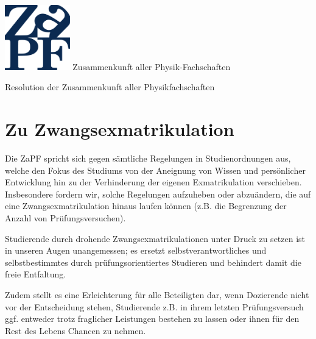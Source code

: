 \documentclass[DIV=calc]{scrartcl}
\begin{document}
    \hspace{0.87\textwidth}
    \begin{minipage}{120pt}
        \vspace{-1.8cm}
        \includegraphics[width=80pt]{../../logo.pdf}
        \centering
        \small Zusammenkunft aller Physik-Fachschaften
    \end{minipage}
    \begin{center}
        \huge{Resolution der Zusammenkunft aller Physikfachschaften}\vspace{.25\baselineskip}\\
        \normalsize
    \end{center}
    \vspace{1cm} 
    
\section*{Zu Zwangsexmatrikulation} 
       
Die ZaPF spricht sich gegen sämtliche Regelungen in Studienordnungen aus, welche den Fokus des Studiums von der Aneignung von Wissen und persönlicher Entwicklung hin zu der Verhinderung der eigenen Exmatrikulation verschieben. Insbesondere fordern wir, solche Regelungen aufzuheben oder abzuändern,  die auf eine Zwangsexmatrikulation hinaus laufen können (z.B. die Begrenzung der Anzahl von Prüfungsversuchen).

Studierende durch drohende Zwangsexmatrikulationen unter Druck zu setzen ist in unseren Augen unangemessen; es ersetzt selbstverantwortliches und selbstbestimmtes durch prüfungsorientiertes Studieren  und behindert damit die freie Entfaltung.

Zudem stellt es eine Erleichterung für alle Beteiligten dar, wenn Dozierende nicht vor der Entscheidung stehen, Studierende z.B. in ihrem letzten Prüfungsversuch ggf. entweder trotz fraglicher Leistungen bestehen zu lassen oder ihnen für den Rest des Lebens Chancen zu nehmen.
\end{document}
